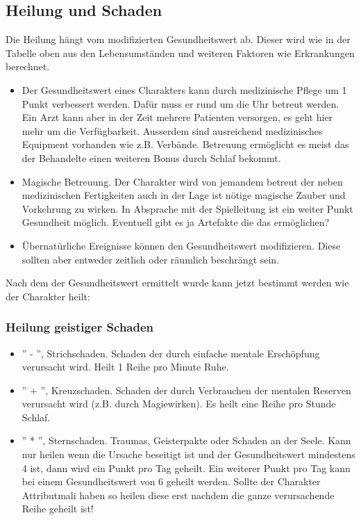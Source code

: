 \documentclass{article}
\begin{document}
\begin{center}
\subsection{Heilung und Schaden}
\end{center}

Die Heilung hängt vom modifizierten Gesundheitswert ab. Dieser wird wie in der Tabelle oben aus den Lebensumständen
und weiteren Faktoren wie Erkrankungen berechnet.

\begin{itemize}
\item Der Gesundheitswert eines Charakters kann durch medizinische Pflege um 1 Punkt verbessert werden. Dafür muss er rund um die Uhr betreut werden. Ein Arzt kann aber in der Zeit mehrere Patienten versorgen, es geht hier mehr um die Verfügbarkeit. Ausserdem sind ausreichend medizinisches Equipment vorhanden wie z.B. Verbände. Betreuung ermöglicht es meist das der Behandelte einen weiteren Bonus durch Schlaf bekommt.
\item Magische Betreuung. Der Charakter wird von jemandem betreut der neben medizinischen Fertigkeiten auch in der Lage ist nötige magische Zauber und Vorkehrung zu wirken. In Absprache mit der Spielleitung ist ein weiter Punkt Gesundheit möglich. Eventuell gibt es ja Artefakte die das ermöglichen?
\item Übernatürliche Ereignisse können den Gesundheitswert modifizieren. Diese sollten aber entweder zeitlich oder räumlich beschrängt sein.
\end{itemize}

Nach dem der Gesundheitswert ermittelt wurde kann jetzt bestimmt werden wie der Charakter heilt:

\subsubsection{Heilung geistiger Schaden}

\begin{itemize}
\item '' - '', Strichschaden. Schaden der durch einfache mentale Erschöpfung verursacht wird. Heilt 1 Reihe pro Minute Ruhe.
\item '' + '', Kreuzschaden. Schaden der durch Verbrauchen der mentalen Reserven verursacht wird (z.B. durch Magiewirken). Es heilt eine Reihe pro Stunde Schlaf.
\item '' * '', Sternschaden. Traumas, Geisterpakte oder Schaden an der Seele. Kann nur heilen wenn die Ursache beseitigt ist und der Gesundheitswert mindestens 4 ist, dann wird ein Punkt pro Tag geheilt. Ein weiterer Punkt pro Tag kann bei einem Gesundheitswert von 6 geheilt werden. Sollte der Charakter Attributmali haben so heilen diese erst nachdem die ganze verursachende Reihe geheilt ist!
\end{itemize}
\end{document}
